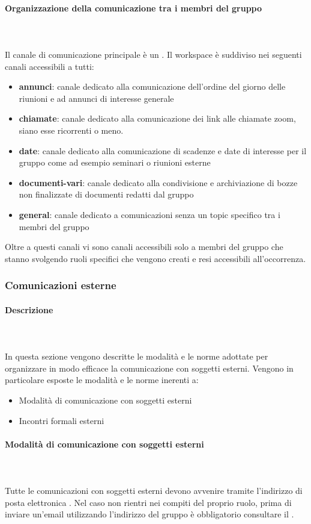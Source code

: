 \paragraph{Organizzazione della comunicazione tra i membri del gruppo}\mbox{}\\
\mbox{}\\
Il canale di comunicazione principale è un  .
Il workspace è suddiviso nei seguenti canali accessibili a tutti:
\begin{itemize}
\item \textbf{annunci}: canale dedicato alla comunicazione dell'ordine del giorno delle riunioni e ad annunci di interesse generale
\item \textbf{chiamate}: canale dedicato alla comunicazione dei link alle chiamate zoom, siano esse ricorrenti o meno.
\item \textbf{date}: canale dedicato alla comunicazione di scadenze e date di interesse per il gruppo come ad esempio seminari o riunioni esterne
\item \textbf{documenti-vari}: canale dedicato alla condivisione e archiviazione di bozze non finalizzate di documenti redatti dal gruppo
\item \textbf{general}: canale dedicato a comunicazioni senza un topic specifico tra i membri del gruppo
\end{itemize}
Oltre a questi canali vi sono canali accessibili solo a membri del gruppo che stanno svolgendo ruoli specifici che vengono creati e resi accessibili all'occorrenza.
\subsubsection{Comunicazioni esterne}
\paragraph{Descrizione}\mbox{}\\
\mbox{}\\
In questa sezione vengono descritte le modalità e le norme adottate per organizzare in modo efficace la comunicazione con soggetti esterni.
Vengono in particolare esposte le modalità e le norme inerenti a:
\begin{itemize}
\item Modalità di comunicazione con soggetti esterni
\item Incontri formali esterni
\end{itemize}
\paragraph{Modalità di comunicazione con soggetti esterni}\mbox{}\\
\mbox{}\\
Tutte le comunicazioni con soggetti esterni devono avvenire tramite l'indirizzo di posta elettronica \emailgruppo{}. Nel caso non rientri nei compiti del proprio ruolo, prima di inviare un'email utilizzando l'indirizzo del gruppo è obbligatorio consultare il \RdP{}.
